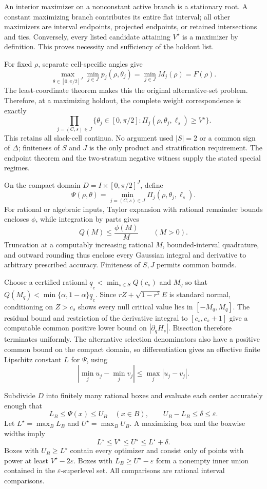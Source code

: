 An interior maximizer on a nonconstant active branch is a stationary root.  A constant maximizing branch contributes its entire flat interval; all other maximizers are interval endpoints, projected endpoints, or retained intersections and ties.  Conversely, every listed candidate attaining \(V^\star\) is a maximizer by definition.  This proves necessity and sufficiency of the holdout list.

For fixed \(\rho\), separate cell-specific angles give
\[
\max_{\theta\in[0,\pi/2]^J}\min_{j\in J}p_j(\rho,\theta_j)
=\min_{j\in J}M_j(\rho)=F(\rho).
\]
The least-coordinate theorem makes this the original alternative-set problem.  Therefore, at a maximizing holdout, the complete weight correspondence is exactly
\[
\prod_{j=(C,s)\in J}
\{\theta_j\in[0,\pi/2]:
\Pi_j(\rho,\theta_j,\ell_s)\ge V^\star\}.
\]
This retains all slack-cell continua.  No argument used \(|S|=2\) or a common sign of \(\Delta\); finiteness of \(S\) and \(J\) is the only product and stratification requirement.  The endpoint theorem and the two-stratum negative witness supply the stated special regimes.

On the compact domain \(D=I\times[0,\pi/2]^J\), define
\[
\Psi(\rho,\theta)=\min_{j=(C,s)\in J}\Pi_j(\rho,\theta_j,\ell_s).
\]
For rational or algebraic inputs, Taylor expansion with rational remainder bounds encloses \(\phi\), while integration by parts gives
\[
Q(M)\le\frac{\phi(M)}M\qquad(M>0).
\]
Truncation at a computably increasing rational \(M\), bounded-interval quadrature, and outward rounding thus enclose every Gaussian integral and derivative to arbitrary prescribed accuracy.  Finiteness of \(S,J\) permits common bounds.

Choose a certified rational \(\underline q_c<\min_{s\in S}Q(c_s)\) and \(M_q\) so that \(Q(M_q)<\min\{\alpha,1-\alpha\}\underline q_c\).  Since \(rZ+\sqrt{1-r^2}E\) is standard normal, conditioning on \(Z>c_s\) shows every null critical value lies in \([-M_q,M_q]\).  The residual bound and restriction of the derivative integral to \([c_s,c_s+1]\) give a computable common positive lower bound on \(|\partial_qH_s|\).  Bisection therefore terminates uniformly.  The alternative selection denominators also have a positive common bound on the compact domain, so differentiation gives an effective finite Lipschitz constant \(L\) for \(\Psi\), using
\[
|\min_j u_j-\min_j v_j|\le\max_j|u_j-v_j|.
\]

Subdivide \(D\) into finitely many rational boxes and evaluate each center accurately enough that
\[
L_B\le\Psi(x)\le U_B\quad(x\in B),
\qquad U_B-L_B\le\delta\le\varepsilon.
\]
Let \(L^\star=\max_BL_B\) and \(U^\star=\max_BU_B\).  A maximizing box and the boxwise widths imply
\[
L^\star\le V^\star\le U^\star\le L^\star+\delta.
\]
Boxes with \(U_B\ge L^\star\) contain every optimizer and consist only of points with power at least \(V^\star-2\varepsilon\).  Boxes with \(L_B\ge U^\star-\varepsilon\) form a nonempty inner union contained in the \(\varepsilon\)-superlevel set.  All comparisons are rational interval comparisons.

